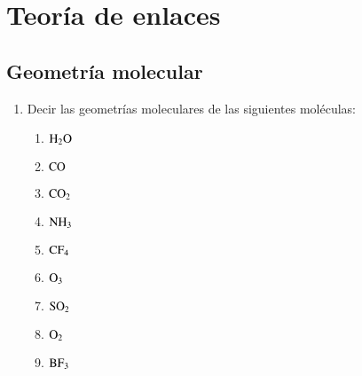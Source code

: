 \section{Teoría de enlaces}

\subsection*{Geometría molecular}

\begin{enumerate}
\item Decir las geometrías moleculares de las siguientes moléculas:
\begin{enumerate}
    \item $\ce{H_2O}$
    \item $\ce{CO}$
    \item $\ce{CO_2}$
    \item $\ce{NH_3}$
    \item $\ce{CF_4}$
    \item $\ce{O_3}$
    \item $\ce{SO_2}$
    \item $\ce{O_2}$
    \item $\ce{BF_3}$
\end{enumerate}
\end{enumerate}

